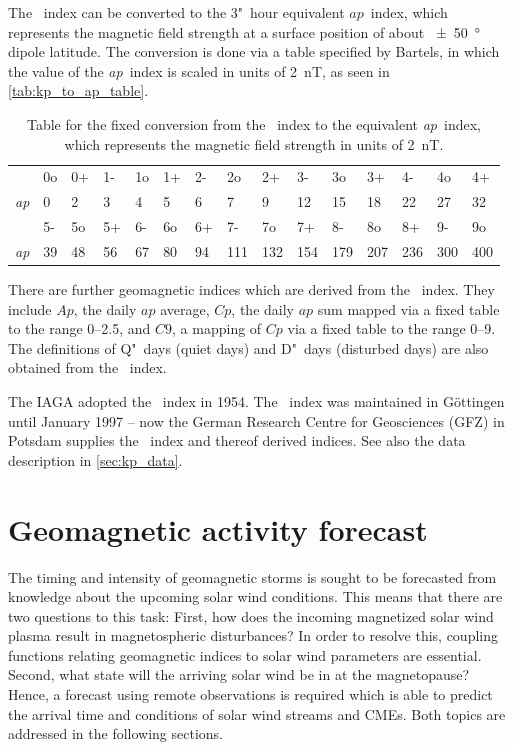 The \Kp{}~index can be converted to the 3"~hour equivalent $ap$~index, which represents the magnetic field strength at a surface position of about \SI{+-50}{\degree} dipole latitude. The conversion is done via a table specified by Bartels, in which the value of the \textit{ap}~index is scaled in units of \SI{2}{nT}, as seen in \autoref{tab:kp_to_ap_table}.
\begin{table}
	\caption{Table for the fixed conversion from the \Kp~index to the equivalent \textit{ap}~index, which represents the magnetic field strength in units of \SI{2}{nT}.}
	\label{tab:kp_to_ap_table}
	\centering
	\begin{tabular}{lssssssssssssss}
		\Kp	&0o	&0+	&1-	&1o	&1+	&2-	&2o	&2+	&3-	&3o	&3+	&4-	&4o	&4+\\
		\textit{ap}	&0	&2	&3	&4	&5	&6	&7	&9	&12	&15	&18	&22	&27	&32\\
		\hline
		\Kp	&5-	&5o	&5+	&6-	&6o	&6+	&7-	&7o	&7+	&8-	&8o	&8+	&9-	&9o\\
		\textit{ap}	&39	&48	&56	&67	&80	&94	&111	&132	&154	&179	&207	&236	&300	&400
	\end{tabular}
\end{table}
There are further geomagnetic indices which are derived from the \Kp{}~index. They include $Ap$, the daily $ap$ average, $Cp$, the daily $ap$ sum mapped via a fixed table to the range \numrange{0}{2.5}, and $C9$, a mapping of $Cp$ via a fixed table to the range \numrange{0}{9}. The definitions of Q"~days (quiet days) and D"~days (disturbed days) are also obtained from the \Kp{}~index.

The IAGA adopted the \Kp{}~index in 1954. The \Kp{}~index was maintained in Göttingen until January 1997 -- now the German Research Centre for Geosciences (GFZ) in Potsdam supplies the \Kp{}~index and thereof derived indices. See also the \Kp{} data description in \autoref{sec:kp_data}.


\section{Geomagnetic activity forecast}
\label{sec:geomagnetic_activity_forecast}
The timing and intensity of geomagnetic storms is sought to be forecasted from knowledge about the upcoming solar wind conditions. This means that there are two questions to this task: First, how does the incoming magnetized solar wind plasma result in magnetospheric disturbances? In order to resolve this, coupling functions relating geomagnetic indices to solar wind parameters are essential. Second, what state will the arriving solar wind be in at the magnetopause? Hence, a forecast using remote observations is required which is able to predict the arrival time and conditions of solar wind streams and CMEs. Both topics are addressed in the following sections.


